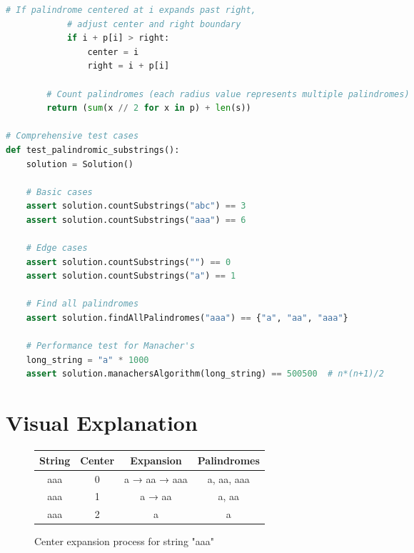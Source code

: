 \begin{fullwidth}
\begin{lstlisting}[language=Python]
            # If palindrome centered at i expands past right,
            # adjust center and right boundary
            if i + p[i] > right:
                center = i
                right = i + p[i]
        
        # Count palindromes (each radius value represents multiple palindromes)
        return (sum(x // 2 for x in p) + len(s))

# Comprehensive test cases
def test_palindromic_substrings():
    solution = Solution()
    
    # Basic cases
    assert solution.countSubstrings("abc") == 3
    assert solution.countSubstrings("aaa") == 6
    
    # Edge cases
    assert solution.countSubstrings("") == 0
    assert solution.countSubstrings("a") == 1
    
    # Find all palindromes
    assert solution.findAllPalindromes("aaa") == {"a", "aa", "aaa"}
    
    # Performance test for Manacher's
    long_string = "a" * 1000
    assert solution.manachersAlgorithm(long_string) == 500500  # n*(n+1)/2
\end{lstlisting}
\end{fullwidth}

\section*{Visual Explanation}
\begin{figure}[h]
    \centering
    \begin{tabular}{|c|c|c|c|}
        \hline
        String & Center & Expansion & Palindromes \\
        \hline
        aaa & 0 & a → aa → aaa & a, aa, aaa \\
        aaa & 1 & a → aa & a, aa \\
        aaa & 2 & a & a \\
        \hline
    \end{tabular}
    \caption{Center expansion process for string "aaa"}
    \label{fig:palindrome_visualization}
\end{figure}

